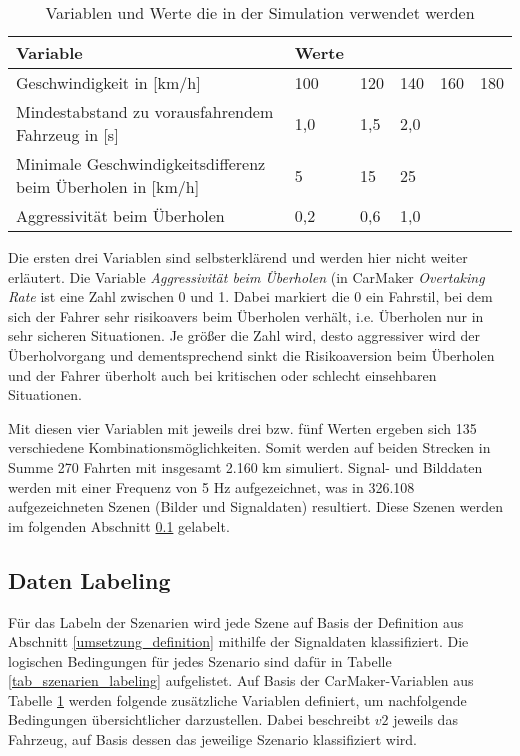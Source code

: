 \begin{table}[h]
\centering
\def\arraystretch{1.4}
\begin{tabular}{p{8cm} p{0.7cm} p{0.7cm} p{0.7cm} p{0.7cm} p{0.7cm}}
\textbf{Variable} & \textbf{Werte} & & & & \\
\hline
Geschwindigkeit in [km/h] & 100 & 120 & 140 & 160 & 180 \\
Mindestabstand zu vorausfahrendem Fahrzeug in [s] & 1,0 & 1,5 & 2,0 & & \\
Minimale Geschwindigkeitsdifferenz beim Überholen in [km/h] & 5 & 15 & 25 & & \\
Aggressivität beim Überholen & 0,2 & 0,6 & 1,0 & & \\
\hline
\end{tabular}
\caption{Variablen und Werte die in der Simulation verwendet werden}
\label{tab_tm_variablen}
\end{table}

Die ersten drei Variablen sind selbsterklärend und werden hier nicht weiter erläutert. Die Variable \textit{Aggressivität beim Überholen} (in CarMaker \textit{Overtaking Rate} ist eine Zahl zwischen 0 und 1. Dabei markiert die 0 ein Fahrstil, bei dem sich der Fahrer sehr risikoavers beim Überholen verhält, i.e. Überholen nur in sehr sicheren Situationen. Je größer die Zahl wird, desto aggressiver wird der Überholvorgang und dementsprechend sinkt die Risikoaversion beim Überholen und der Fahrer überholt auch bei kritischen oder schlecht einsehbaren Situationen.

Mit diesen vier Variablen mit jeweils drei bzw. fünf Werten ergeben sich 135 verschiedene Kombinationsmöglichkeiten. Somit werden auf beiden Strecken in Summe 270 Fahrten mit insgesamt 2.160 km simuliert. Signal- und Bilddaten werden mit einer Frequenz von 5 Hz aufgezeichnet, was in 326.108 aufgezeichneten Szenen (Bilder und Signaldaten) resultiert. Diese Szenen werden im folgenden Abschnitt \ref{umsetzung_daten_synth_labeling} gelabelt.


\subsection{Daten Labeling}
\label{umsetzung_daten_synth_labeling}

Für das Labeln der Szenarien wird jede Szene auf Basis der Definition aus Abschnitt \ref{umsetzung_definition} mithilfe der Signaldaten klassifiziert. Die logischen Bedingungen für jedes Szenario sind dafür in Tabelle \ref{tab_szenarien_labeling} aufgelistet. Auf Basis der CarMaker-Variablen aus Tabelle \ref{tab_tm_variablen} werden folgende zusätzliche Variablen definiert, um nachfolgende Bedingungen übersichtlicher darzustellen. Dabei beschreibt $v2$ jeweils das Fahrzeug, auf Basis dessen das jeweilige Szenario klassifiziert wird.

